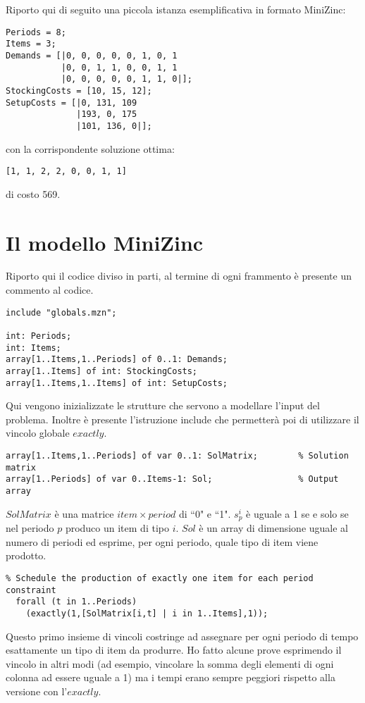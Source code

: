 \documentclass[12pt]{article}
\begin{document}
Riporto qui di seguito una piccola istanza esemplificativa in formato MiniZinc:
\begin{verbatim}
Periods = 8;
Items = 3;
Demands = [|0, 0, 0, 0, 0, 1, 0, 1
           |0, 0, 1, 1, 0, 0, 1, 1
           |0, 0, 0, 0, 0, 1, 1, 0|];
StockingCosts = [10, 15, 12];
SetupCosts = [|0, 131, 109
              |193, 0, 175
              |101, 136, 0|];
\end{verbatim}
con la corrispondente soluzione ottima:
\begin{verbatim}
[1, 1, 2, 2, 0, 0, 1, 1]
\end{verbatim}
di costo 569.
\pagebreak

\section*{Il modello MiniZinc}
Riporto qui il codice diviso in parti, al termine di ogni frammento è presente un commento al codice.
\begin{verbatim}
include "globals.mzn";

int: Periods;
int: Items;
array[1..Items,1..Periods] of 0..1: Demands;
array[1..Items] of int: StockingCosts;
array[1..Items,1..Items] of int: SetupCosts;
\end{verbatim}
Qui vengono inizializzate le strutture che servono a modellare l'input del problema. Inoltre è presente l'istruzione include che permetterà poi di utilizzare il vincolo globale $exactly$.

\begin{verbatim}
array[1..Items,1..Periods] of var 0..1: SolMatrix;        % Solution matrix
array[1..Periods] of var 0..Items-1: Sol;                 % Output array
\end{verbatim}
$SolMatrix$ è una matrice $item\times period$ di ``0" e ``1". $s^i_p$ è uguale a 1 se e solo se nel periodo $p$ produco un item di tipo $i$. $Sol$ è un array di dimensione uguale al numero di periodi ed esprime, per ogni periodo, quale tipo di item viene prodotto.

\begin{verbatim}
% Schedule the production of exactly one item for each period
constraint
  forall (t in 1..Periods)
    (exactly(1,[SolMatrix[i,t] | i in 1..Items],1));
\end{verbatim}
Questo primo insieme di vincoli costringe ad assegnare per ogni periodo di tempo esattamente un tipo di item da produrre. Ho fatto alcune prove esprimendo il vincolo in altri modi (ad esempio, vincolare la somma degli elementi di ogni colonna ad essere uguale a 1) ma i tempi erano sempre peggiori rispetto alla versione con l'$exactly$.
\pagebreak
\end{document}
